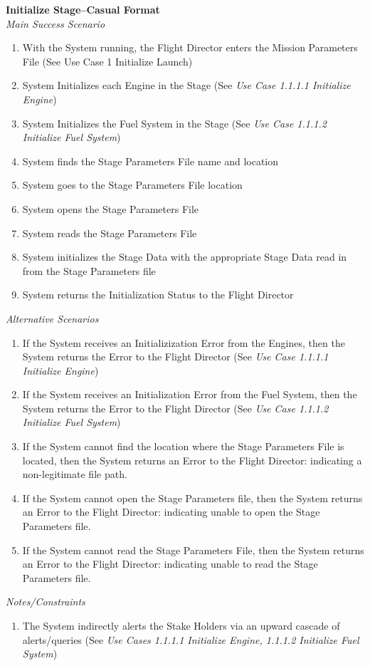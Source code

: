 \documentclass[letterpaper]{article}
\begin{document}
\noindent
\textbf{Initialize Stage--Casual Format}\\
\textit{Main Success Scenario}
\begin{enumerate}
   \item With the System running, the Flight Director enters the 
      Mission Parameters File (See Use Case 1 Initialize Launch)
   \item System Initializes each Engine in the Stage (See 
      \textit{Use Case 1.1.1.1 Initialize Engine})
   \item System Initializes the Fuel System in the Stage (See 
      \textit{Use Case 1.1.1.2 Initialize Fuel System})
   \item System finds the Stage Parameters File name and location
   \item System goes to the Stage Parameters File location
   \item System opens the Stage Parameters File
   \item System reads the Stage Parameters File
   \item System initializes the Stage Data with the appropriate Stage
      Data read in from the Stage Parameters file
   \item System returns the Initialization Status to the Flight 
      Director
\end{enumerate}
\textit{Alternative Scenarios}
\begin{enumerate}
   \item[2a]If the System receives an Initializization Error from the
      Engines, then the System returns the Error to the Flight 
      Director (See 
      \textit{Use Case 1.1.1.1 Initialize Engine})
   \item[3a]If the System receives an Initialization Error from the
      Fuel System, then the System returns the Error to the 
      Flight Director (See 
      \textit{Use Case 1.1.1.2 Initialize Fuel System})
   \item[4a,5a]If the System cannot find the location where the Stage
      Parameters File is located, then the System returns an Error to
      the Flight Director:  indicating a non-legitimate file path.
   \item[6a]If the System cannot open the Stage Parameters file, then
      the System returns an Error to the Flight Director:  indicating
      unable to open the Stage Parameters file.
   \item[7a]If the System cannot read the Stage Parameters File, then
      the System returns an Error to the Flight Director:  indicating
      unable to read the Stage Parameters file.
\end{enumerate}
\textit{Notes/Constraints}
\begin{enumerate}
   \item[9a]The System indirectly alerts the Stake Holders via an 
      upward cascade of alerts/queries (See 
      \textit{Use Cases 1.1.1.1 Initialize Engine, 
      1.1.1.2 Initialize Fuel System})
\end{enumerate}
\end{document}

